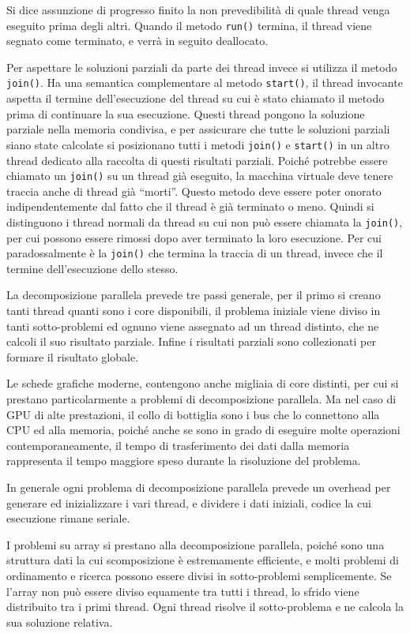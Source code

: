 \documentclass{article}
\numberwithin{equation}{subsection}
\begin{document}
Si dice assunzione di progresso finito la non prevedibilità di quale thread venga eseguito prima degli altri. Quando il metodo \verb|run()| termina, il thread viene segnato 
come terminato, e verrà in seguito deallocato. 


Per aspettare le soluzioni parziali da parte dei thread invece si utilizza il metodo \verb|join()|. Ha una semantica complementare al metodo \verb|start()|, il thread 
invocante aspetta il termine dell'esecuzione del thread su cui è stato chiamato il metodo prima di continuare la sua esecuzione. 
Questi thread pongono la soluzione parziale nella memoria condivisa, e per assicurare che tutte le soluzioni parziali siano state calcolate si posizionano tutti i metodi 
\verb|join()| e \verb|start()| in un altro thread dedicato alla raccolta di questi risultati parziali. 
Poiché potrebbe essere chiamato un \verb|join()| su un thread già eseguito, la macchina virtuale deve tenere traccia anche di thread già ``morti''. Questo metodo deve 
essere poter onorato indipendentemente dal fatto che il thread è già terminato o meno. Quindi si distinguono i thread normali da thread su cui non può essere chiamata la \verb|join()|, 
per cui possono essere rimossi dopo aver terminato la loro esecuzione. 
Per cui paradossalmente è la \verb|join()| che termina la traccia di un thread, invece che il termine dell'esecuzione dello stesso. 

La decomposizione parallela prevede tre passi generale, per il primo si creano tanti thread quanti sono i core disponibili, il problema iniziale viene diviso in 
tanti sotto-problemi ed ognuno viene assegnato ad un thread distinto, che ne calcoli il suo risultato parziale. Infine i risultati parziali sono collezionati per 
formare il risultato globale. 

Le schede grafiche moderne, contengono anche migliaia di core distinti, per cui si prestano particolarmente a problemi di decomposizione parallela. Ma nel caso di GPU 
di alte prestazioni, il collo di bottiglia sono i bus che lo connettono alla CPU ed alla memoria, poiché anche se sono in grado di eseguire molte operazioni contemporaneamente, 
il tempo di trasferimento dei dati dalla memoria rappresenta il tempo maggiore speso durante la risoluzione del problema. 

In generale ogni problema di decomposizione parallela prevede un overhead per generare ed inizializzare i vari thread, e dividere i dati iniziali, codice la cui esecuzione 
rimane seriale. 

I problemi su array si prestano alla decomposizione parallela, poiché sono una struttura dati la cui scomposizione è estremamente efficiente, e molti problemi di ordinamento 
e ricerca possono essere divisi in sotto-problemi semplicemente. Se l'array non può essere diviso equamente tra tutti i thread, lo sfrido viene distribuito tra i primi 
thread. 
Ogni thread risolve il sotto-problema e ne calcola la sua soluzione relativa. 
\end{document}
